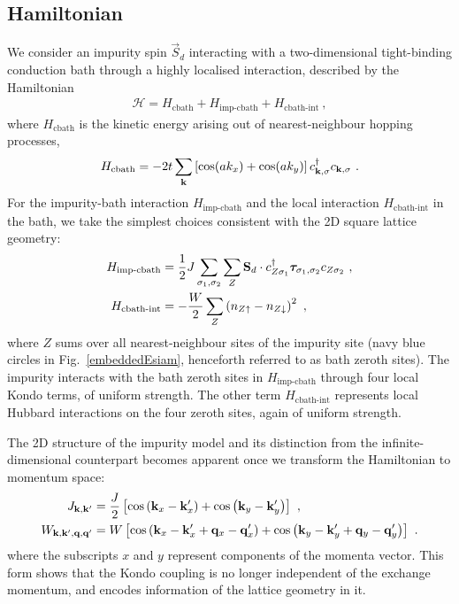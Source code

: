 \documentclass[reprint,hidelinks,onecolumn]{revtex4-2}
\begin{document}
\subsection{Hamiltonian}
We consider an impurity spin \(\vec S_d\) interacting with a two-dimensional tight-binding conduction bath through a highly localised interaction, described by the Hamiltonian
\begin{equation}\begin{aligned}
	\mathcal{H} = H_\text{cbath} + H_\text{imp-cbath} + H_\text{cbath-int}~,
\end{aligned}\end{equation}
where \(H_\text{cbath}\) is the kinetic energy arising out of nearest-neighbour hopping processes,
\begin{equation}\begin{aligned}
	H_\text{cbath} = -2t\sum_{{\bf k}}\left[\cos(ak_x) + \cos(ak_y)\right] c^\dagger_{{\bf k},\sigma}c_{{\bf k},\sigma}~.
\end{aligned}\end{equation}
For the impurity-bath interaction \(H_\text{imp-cbath}\) and the local interaction \(H_\text{cbath-int}\) in the bath, we take the simplest choices consistent with the 2D square lattice geometry:
\begin{equation}\begin{aligned}
	H_\text{imp-cbath} &=\frac{1}{2} J\sum_{\sigma_1,\sigma_2}\sum_{Z} {\bf S}_d\cdot c^\dagger_{Z\sigma_1}{\boldsymbol \tau}_{\sigma_1,\sigma_2} c_{Z\sigma_2}~,\\
	H_\text{cbath-int} &= -\frac{W}{2}\sum_{Z} \left(n_{Z\uparrow} - n_{Z\downarrow}\right)^2 ~,
\end{aligned}\end{equation}
where \(Z\) sums over all nearest-neighbour sites of the impurity site (navy blue circles in Fig.~\ref{embeddedEsiam}, henceforth referred to as bath zeroth sites). The impurity interacts with the bath zeroth sites in \(H_\text{imp-cbath}\) through four local Kondo terms, of uniform strength. The other term \(H_\text{cbath-int}\) represents local Hubbard interactions on the four zeroth sites, again of uniform strength.

The 2D structure of the impurity model and its distinction from the infinite-dimensional counterpart becomes apparent once we transform the Hamiltonian to momentum space:
\begin{equation}\begin{aligned}
	J_{{\bf k}, {\bf k}^\prime} &= \frac{J}{2}\left[\cos\left({\bf k}_x - {\bf k}^\prime_x\right) + \cos\left({\bf k}_y - {\bf k}^\prime_y\right)\right] ~,\\
	W_{{\bf k}, {\bf k}^\prime,{\bf q}, {\bf q}^\prime} &= W\left[\cos\left({\bf k}_x - {\bf k}^\prime_x + {\bf q}_x - {\bf q}^\prime_x\right) + \cos\left({\bf k}_y - {\bf k}^\prime_y + {\bf q}_y - {\bf q}^\prime_y\right)\right] ~.
\end{aligned}\end{equation}
where the subscripts \(x\) and \(y\) represent components of the momenta vector. This form shows that the Kondo coupling is no longer independent of the exchange momentum, and encodes information of the lattice geometry in it.
\end{document}
